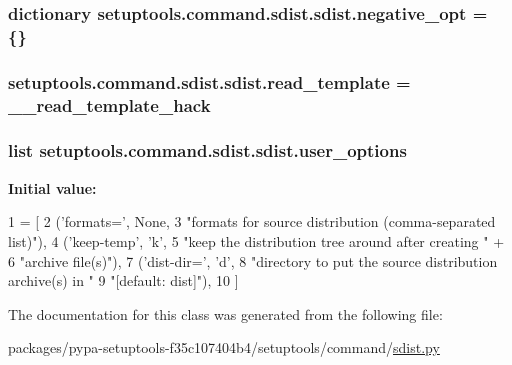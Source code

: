 \subsubsection[{negative\+\_\+opt}]{\setlength{\rightskip}{0pt plus 5cm}dictionary setuptools.\+command.\+sdist.\+sdist.\+negative\+\_\+opt = \{\}\hspace{0.3cm}{\ttfamily [static]}}\label{classsetuptools_1_1command_1_1sdist_1_1sdist_ac646686bba8f3b6cea7caaf817ba9bfd}
\hypertarget{classsetuptools_1_1command_1_1sdist_1_1sdist_a706771d08f1f5e3c3310d5e8a78d519b}{}
\subsubsection[{read\+\_\+template}]{\setlength{\rightskip}{0pt plus 5cm}setuptools.\+command.\+sdist.\+sdist.\+read\+\_\+template = \+\_\+\+\_\+read\+\_\+template\+\_\+hack\hspace{0.3cm}{\ttfamily [static]}}\label{classsetuptools_1_1command_1_1sdist_1_1sdist_a706771d08f1f5e3c3310d5e8a78d519b}
\hypertarget{classsetuptools_1_1command_1_1sdist_1_1sdist_acfe46efe9345704f397cca0715a06673}{}
\subsubsection[{user\+\_\+options}]{\setlength{\rightskip}{0pt plus 5cm}list setuptools.\+command.\+sdist.\+sdist.\+user\+\_\+options\hspace{0.3cm}{\ttfamily [static]}}\label{classsetuptools_1_1command_1_1sdist_1_1sdist_acfe46efe9345704f397cca0715a06673}
{\bfseries Initial value\+:}
\begin{DoxyCode}
1 = [
2         (\textcolor{stringliteral}{'formats='}, \textcolor{keywordtype}{None},
3          \textcolor{stringliteral}{"formats for source distribution (comma-separated list)"}),
4         (\textcolor{stringliteral}{'keep-temp'}, \textcolor{stringliteral}{'k'},
5          \textcolor{stringliteral}{"keep the distribution tree around after creating "} +
6          \textcolor{stringliteral}{"archive file(s)"}),
7         (\textcolor{stringliteral}{'dist-dir='}, \textcolor{stringliteral}{'d'},
8          \textcolor{stringliteral}{"directory to put the source distribution archive(s) in "}
9          \textcolor{stringliteral}{"[default: dist]"}),
10     ]
\end{DoxyCode}


The documentation for this class was generated from the following file\+:\begin{DoxyCompactItemize}
\item 
packages/pypa-\/setuptools-\/f35c107404b4/setuptools/command/\hyperlink{sdist_8py}{sdist.\+py}\end{DoxyCompactItemize}
